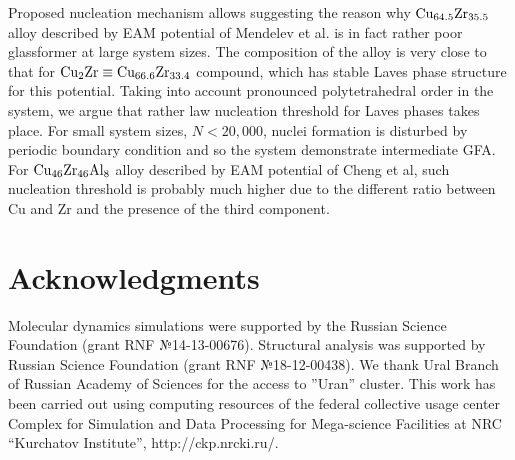 \documentclass[jcp,twocolumn,superscriptaddress,floatfix,graphicx,showpacs]{revtex4-1}
\begin{document}
Proposed nucleation mechanism allows suggesting the reason why ${\rm Cu_{64.5}Zr_{35.5}}$ alloy described by EAM potential of Mendelev et al. is in fact rather poor glassformer at large system sizes. The composition of the alloy is very close to that for ${\rm Cu_2 Zr}\equiv {\rm Cu_{66.6}Zr_{33.4}}$ compound, which has stable Laves phase structure for this potential. Taking into account pronounced polytetrahedral order in the system, we argue that rather law nucleation threshold for Laves phases takes place. For small system sizes, $N < 20,000$, nuclei formation is disturbed by periodic boundary condition \cite{Honeycutt1986JPC} and so the system demonstrate intermediate GFA. For ${\rm Cu_{46}Zr_{46}Al_{8}}$ alloy described by EAM potential of Cheng et al, such nucleation threshold is probably much higher due to the different ratio between Cu and Zr and the presence of the third component.


\section{Acknowledgments}
Molecular dynamics simulations were supported by the Russian Science Foundation (grant RNF №14-13-00676). Structural analysis was supported by Russian Science Foundation (grant RNF №18-12-00438). We thank Ural Branch of Russian Academy of Sciences for the access to ''Uran'' cluster. This work has been carried out using computing resources of the federal collective usage center Complex for Simulation and Data Processing for Mega-science Facilities at NRC “Kurchatov Institute”, http://ckp.nrcki.ru/.


\end{document}
